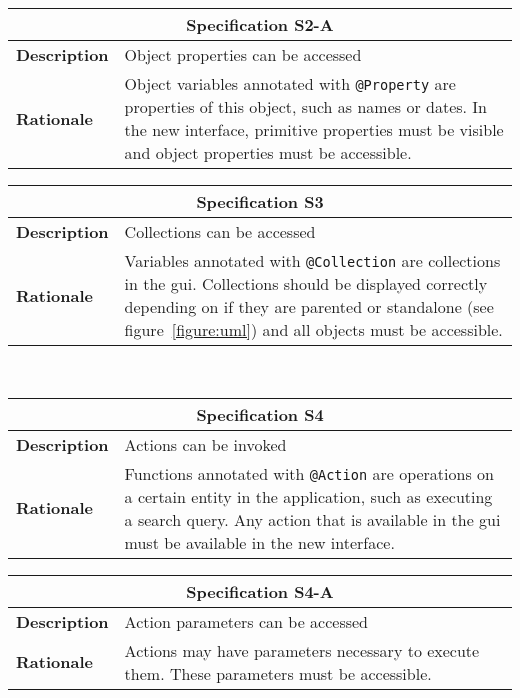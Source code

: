 \begin{tabularx}{0.49\textwidth}[t]{lX}
	\toprule
	\multicolumn{2}{c}{\textbf{Specification S2-A}} \\
	\midrule
	\textbf{Description} & Object properties can be accessed \\
	\addlinespace[0.5em]
	\textbf{Rationale}	 & Object variables annotated with \texttt{@Property} are properties of this object, such as names or dates. In the new interface, primitive properties must be visible and object properties must be accessible.\\
	\bottomrule
\end{tabularx}\hspace{0.02\textwidth}
\begin{tabularx}{0.49\textwidth}[t]{lX}
	\toprule
	\multicolumn{2}{c}{\textbf{Specification S3}} \\
	\midrule
	\textbf{Description} & Collections can be accessed \newline \\
	\addlinespace[0.5em]
	\textbf{Rationale}	 & Variables annotated with \texttt{@Collection} are collections in the \acrshort{gui}. Collections should be displayed correctly depending on if they are parented or standalone (see figure~\ref{figure:uml}) and all objects must be accessible. \\
	\bottomrule
\end{tabularx}
\\[1em]

\begin{tabularx}{0.49\textwidth}[t]{lX}
	\toprule
	\multicolumn{2}{c}{\textbf{Specification S4}} \\
	\midrule
	\textbf{Description} & Actions can be invoked \newline \\
	\addlinespace[0.5em]
	\textbf{Rationale}	 & Functions annotated with \texttt{@Action} are operations on a certain entity in the application, such as executing a search query. Any action that is available in the \acrshort{gui} must be available in the new interface. \\
	\bottomrule
\end{tabularx}\hspace{0.02\textwidth}
\begin{tabularx}{0.49\textwidth}[t]{lX}
	\toprule
	\multicolumn{2}{c}{\textbf{Specification S4-A}} \\
	\midrule
	\textbf{Description} & Action parameters can be accessed \\
	\addlinespace[0.5em]
	\textbf{Rationale}	 & Actions may have parameters necessary to execute them. These parameters must be accessible. \newline \newline \newline \\
	\bottomrule
\end{tabularx}
\\[1em]

